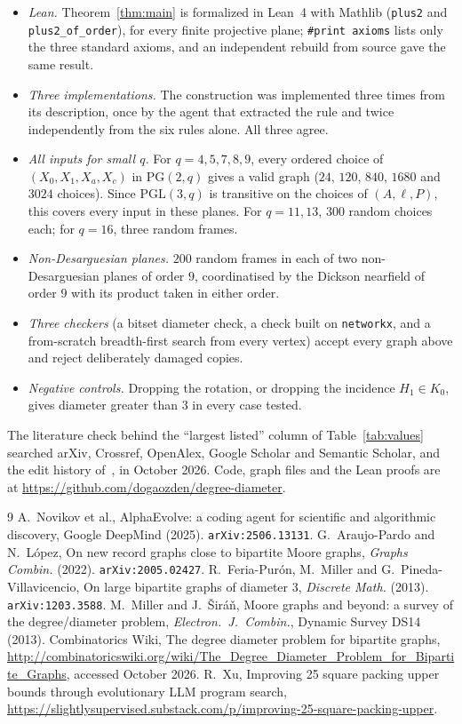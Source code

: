 \documentclass[11pt]{amsart}
\theoremstyle{remark}
\newcommand{\PG}{\mathrm{PG}}
\begin{document}
\begin{itemize}[leftmargin=2em]
\item \emph{Lean.} Theorem~\ref{thm:main} is formalized in Lean~4 with Mathlib (\texttt{plus2} and \texttt{plus2\_of\_order}), for every finite projective plane; \texttt{\#print axioms} lists only the three standard axioms, and an independent rebuild from source gave the same result.
\item \emph{Three implementations.} The construction was implemented three times from its description, once by the agent that extracted the rule and twice independently from the six rules alone. All three agree.
\item \emph{All inputs for small $q$.} For $q = 4, 5, 7, 8, 9$, every ordered choice of $(X_0, X_1, X_a, X_c)$ in $\PG(2,q)$ gives a valid graph ($24$, $120$, $840$, $1680$ and $3024$ choices). Since $\mathrm{PGL}(3,q)$ is transitive on the choices of $(A, \ell, P)$, this covers every input in these planes. For $q = 11, 13$, $300$ random choices each; for $q = 16$, three random frames.
\item \emph{Non-Desarguesian planes.} $200$ random frames in each of two non-Desarguesian planes of order $9$, coordinatised by the Dickson nearfield of order $9$ with its product taken in either order.
\item \emph{Three checkers} (a bitset diameter check, a check built on \texttt{networkx}, and a from-scratch breadth-first search from every vertex) accept every graph above and reject deliberately damaged copies.
\item \emph{Negative controls.} Dropping the rotation, or dropping the incidence $H_1 \in K_0$, gives diameter greater than $3$ in every case tested.
\end{itemize}
The literature check behind the ``largest listed'' column of Table~\ref{tab:values} searched arXiv, Crossref, OpenAlex, Google Scholar and Semantic Scholar, and the edit history of~\cite{wiki}, in October 2026. Code, graph files and the Lean proofs are at \url{https://github.com/dogaozden/degree-diameter}.

\begin{thebibliography}{9}
 A.~Novikov et al., AlphaEvolve: a coding agent for scientific and algorithmic discovery, Google DeepMind (2025). \texttt{arXiv:2506.13131}.
 G.~Araujo-Pardo and N.~L\'opez, On new record graphs close to bipartite Moore graphs, \emph{Graphs Combin.} (2022). \texttt{arXiv:2005.02427}.
 R.~Feria-Pur\'on, M.~Miller and G.~Pineda-Villavicencio, On large bipartite graphs of diameter 3, \emph{Discrete Math.} (2013). \texttt{arXiv:1203.3588}.
 M.~Miller and J.~\v{S}ir\'a\v{n}, Moore graphs and beyond: a survey of the degree/diameter problem, \emph{Electron.\ J.\ Combin.}, Dynamic Survey DS14 (2013).
 Combinatorics Wiki, The degree diameter problem for bipartite graphs, \url{http://combinatoricswiki.org/wiki/The_Degree_Diameter_Problem_for_Bipartite_Graphs}, accessed October 2026.
 R.~Xu, Improving 25 square packing upper bounds through evolutionary LLM program search, \url{https://slightlysupervised.substack.com/p/improving-25-square-packing-upper}.
\end{thebibliography}
\end{document}
